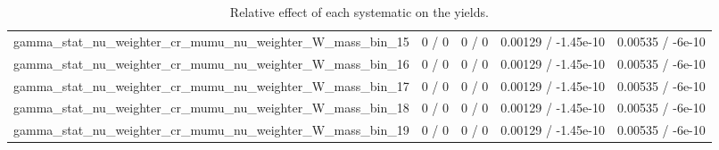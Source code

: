 \documentclass[10pt]{article}
\begin{document}
\begin{table}[htbp]
\begin{center}
\begin{tabular}{|c|c|c|c|c|}
  gamma_stat_nu_weighter_cr_mumu_nu_weighter_W_mass_bin_15 & 0 / 0 & 0 / 0 & 0.00129 / -1.45e-10 & 0.00535 / -6e-10 \\ 
  gamma_stat_nu_weighter_cr_mumu_nu_weighter_W_mass_bin_16 & 0 / 0 & 0 / 0 & 0.00129 / -1.45e-10 & 0.00535 / -6e-10 \\ 
  gamma_stat_nu_weighter_cr_mumu_nu_weighter_W_mass_bin_17 & 0 / 0 & 0 / 0 & 0.00129 / -1.45e-10 & 0.00535 / -6e-10 \\ 
  gamma_stat_nu_weighter_cr_mumu_nu_weighter_W_mass_bin_18 & 0 / 0 & 0 / 0 & 0.00129 / -1.45e-10 & 0.00535 / -6e-10 \\ 
  gamma_stat_nu_weighter_cr_mumu_nu_weighter_W_mass_bin_19 & 0 / 0 & 0 / 0 & 0.00129 / -1.45e-10 & 0.00535 / -6e-10 \\ 
\hline 
\end{tabular} 
\caption{Relative effect of each systematic on the yields.} 
\end{center} 
\end{table} 
\end{document}
